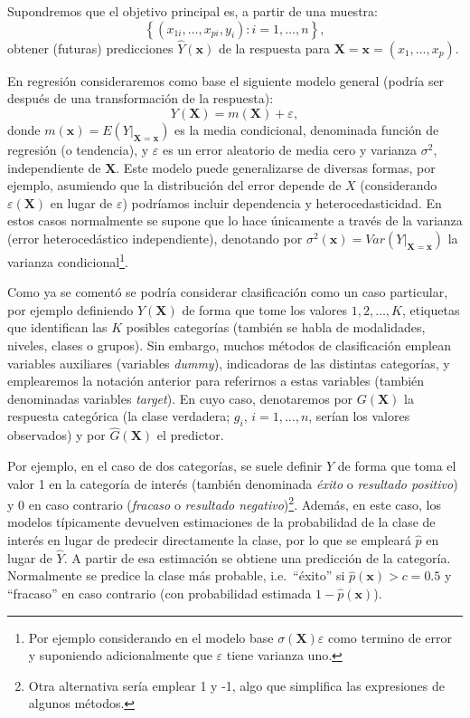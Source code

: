 \documentclass[
]{book}
\theoremstyle{break}
\theoremstyle{definition}
\theoremstyle{definition}
\theoremstyle{definition}
\theoremstyle{remark}
\begin{document}
Supondremos que el objetivo principal es, a partir de una muestra:
\[\left\{ \left( x_{1i}, \ldots, x_{pi}, y_{i} \right)  : i = 1, \ldots, n \right\},\]
obtener (futuras) predicciones \(\hat Y\left(\mathbf{x} \right)\) de la respuesta para \(\mathbf{X}=\mathbf{x}=\left(x_{1}, \ldots, x_{p}\right)\).

En regresión consideraremos como base el siguiente modelo general (podría ser después de una transformación de la respuesta):
\begin{equation} 
  Y(\mathbf{X})=m(\mathbf{X})+\varepsilon,
  \label{eq:modelogeneral}
\end{equation}
donde \(m(\mathbf{x}) = E\left( \left. Y\right\vert_{\mathbf{X}=\mathbf{x}} \right)\) es la media condicional, denominada función de regresión (o tendencia), y \(\varepsilon\) es un error aleatorio de media cero y varianza \(\sigma^2\), independiente de \(\mathbf{X}\).
Este modelo puede generalizarse de diversas formas, por ejemplo, asumiendo que la distribución del error depende de \(X\) (considerando \(\varepsilon(\mathbf{X})\) en lugar de \(\varepsilon\)) podríamos incluir dependencia y heterocedasticidad.
En estos casos normalmente se supone que lo hace únicamente a través de la varianza (error heterocedástico independiente), denotando por \(\sigma^2(\mathbf{x}) = Var\left( \left. Y\right\vert_{\mathbf{X}=\mathbf{x}} \right)\) la varianza condicional\footnote{Por ejemplo considerando en el modelo base \(\sigma(\mathbf{X})\varepsilon\) como termino de error y suponiendo adicionalmente que \(\varepsilon\) tiene varianza uno.}.

Como ya se comentó se podría considerar clasificación como un caso particular, por ejemplo definiendo \(Y\left(\mathbf{X} \right)\) de forma que tome los valores \(1, 2, \ldots, K\), etiquetas que identifican las \(K\) posibles categorías (también se habla de modalidades, niveles, clases o grupos).
Sin embargo, muchos métodos de clasificación emplean variables auxiliares (variables \emph{dummy}), indicadoras de las distintas categorías, y emplearemos la notación anterior para referirnos a estas variables (también denominadas variables \emph{target}). En cuyo caso, denotaremos por \(G \left(\mathbf{X} \right)\) la respuesta categórica (la clase verdadera; \(g_i\), \(i =1, \ldots, n\), serían los valores observados) y por \(\hat G \left(\mathbf{X} \right)\) el predictor.

Por ejemplo, en el caso de dos categorías, se suele definir \(Y\) de forma que toma el valor 1 en la categoría de interés (también denominada \emph{éxito} o \emph{resultado positivo}) y 0 en caso contrario (\emph{fracaso} o \emph{resultado negativo})\footnote{Otra alternativa sería emplear 1 y -1, algo que simplifica las expresiones de algunos métodos.}.
Además, en este caso, los modelos típicamente devuelven estimaciones de la probabilidad de la clase de interés en lugar de predecir directamente la clase, por lo que se empleará \(\hat p\) en lugar de \(\hat Y\).
A partir de esa estimación se obtiene una predicción de la categoría.
Normalmente se predice la clase más probable, i.e.~``éxito'' si \(\hat p(\mathbf{x}) > c = 0.5\) y ``fracaso'' en caso contrario (con probabilidad estimada \(1 - \hat p(\mathbf{x})\)).
\end{document}

